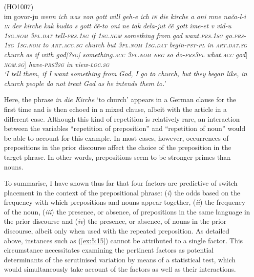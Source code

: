 \ea
\label{ex5.16}
(HO1007)\\
 {im} {govor-ju} \itshape{wenn} \itshape{ich} \itshape{was} \itshape{von} \itshape{gott} \itshape{will} \itshape{geh-e} \itshape{ich} \itshape{\textsc{in}} \itshape{die} \itshape{kirche} {a} {oni} {mne} {nača-l-i} \itshape{\textsc{in}} \itshape{der} \itshape{kirche} {kak} {budto} {s} \textit{gott} {čë-to} {oni} {ne} {tak} {dela-jut} {čë} \textit{gott} {ime-et} {v} {vid-u}\\
	{\textsc{1sg.nom}} \textsc{3pl.dat} tell-\textsc{prs.1sg} if \textsc{1sg.nom} something from god want.\textsc{prs.1sg} go.\textsc{prs-1sg} \textsc{1sg.nom} to \textsc{art.acc.sg} church but \textsc{3pl.nom} \textsc{1sg.dat} begin-\textsc{pst-pl} in \textsc{art.dat.sg} church as if with god[\textsc{?sg}] something.\textsc{acc} \textsc{3pl.nom} \textsc{neg} so do-\textsc{prs3pl} what.\textsc{acc} god\([\)\textsc{nom.sg}\(]\) have-\textsc{prs3sg} in view-\textsc{loc.sg}\\
\glt `I tell them, if I want something from God, I go to church, but they began like, in church people do not treat God as he intends them to.'
\z

\noindent Here, the phrase \textit{in die Kirche} `to church' appears in a German clause for the first time and is then echoed in a mixed clause, albeit with the article in a different case. Although this kind of repetition is relatively rare, an interaction between the variables “repetition of preposition” and “repetition of noun” would be able to account for this example. In most cases, however, occurrences of prepositions in the prior discourse affect the choice of the preposition in the target phrase. In other words, prepositions seem to be stronger primes than nouns.

To summarise, I have shown thus far that four factors are predictive of switch placement in the context of the prepositional phrase: (\textit{i}) the odds based on the frequency with which prepositions and nouns appear together, (\textit{ii}) the frequency of the noun, (\textit{iii}) the presence, or absence, of prepositions in the same language in the prior discourse and (\textit{iv}) the presence, or absence, of nouns in the prior discourse, albeit only when used with the repeated preposition. As detailed above, instances such as (\ref{ex:5:15}) cannot be attributed to a single factor. This circumstance necessitates examining the pertinent factors as potential determinants of the scrutinised variation by means of a statistical test, which would simultaneously take account of the factors as well as their interactions.

